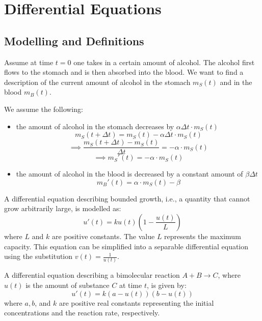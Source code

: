 \section{Differential Equations}

\subsection{Modelling and Definitions}

\begin{example}
    Assume at time $t=0$ one takes in a certain amount of alcohol. The alcohol first flows to the stomach and is then absorbed into the blood. We want to find a description of the current amount of alcohol in the stomach $m_S(t)$ and in the blood $m_B(t)$.

    We assume the following: 
    \begin{itemize}
        \item the amount of alcohol in the stomach decreases by $ \alpha \Delta t \cdot m_S(t) $
        $$m_S(t+\Delta t) = m_S(t) - \alpha \Delta t \cdot m_S(t)$$
        $$\implies \frac{m_S(t+\Delta t) - m_S(t)}{\Delta t} = - \alpha \cdot m_S(t)$$
        $$\implies m_S'(t) = - \alpha \cdot m_S(t)$$
        \item the amount of alcohol in the blood is decreased by a constant amount of $\beta \Delta t$
        $$m_B'(t) = \alpha \cdot m_S(t) - \beta$$
    \end{itemize}
\end{example}

\begin{example}
    A differential equation describing bounded growth, i.e., a quantity that cannot grow arbitrarily large, is modelled as:
    $$u'(t) = k u(t) \left(1 - \frac{u(t)}{L}\right)$$
    where $L$ and $k$ are positive constants. The value $L$ represents the maximum capacity. This equation can be simplified into a separable differential equation using the substitution $v(t) = \frac{1}{u(t)}$.
\end{example}

\begin{example}
    A differential equation describing a bimolecular reaction $A + B \rightarrow C$, where $u(t)$ is the amount of substance $C$ at time $t$, is given by:
    $$u'(t) = k(a - u(t))(b - u(t))$$
    where $a, b$, and $k$ are positive real constants representing the initial concentrations and the reaction rate, respectively.
\end{example}

